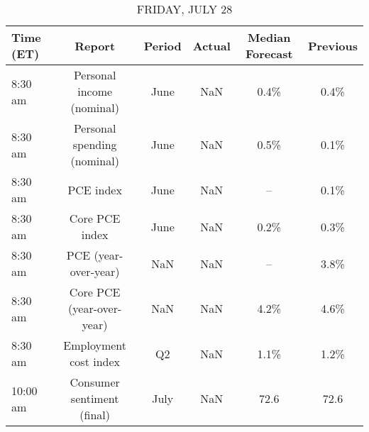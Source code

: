 \documentclass{article}%
\begin{document}
\begin{table}[htbp]%
\caption{FRIDAY, JULY 28}%
\centering%
\begin{adjustbox}{width=1\textwidth}%
\begin{tabular}{lccccc}
\toprule
Time (ET) &                      Report & Period & Actual & Median Forecast & Previous \\
\midrule
  8:30 am &   Personal income (nominal) &   June &    NaN &            0.4\% &     0.4\% \\
  8:30 am & Personal spending (nominal) &   June &    NaN &            0.5\% &     0.1\% \\
  8:30 am &                   PCE index &   June &    NaN &              -- &     0.1\% \\
  8:30 am &              Core PCE index &   June &    NaN &            0.2\% &     0.3\% \\
  8:30 am &        PCE (year-over-year) &    NaN &    NaN &              -- &     3.8\% \\
  8:30 am &   Core PCE (year-over-year) &    NaN &    NaN &            4.2\% &     4.6\% \\
  8:30 am &       Employment cost index &     Q2 &    NaN &            1.1\% &     1.2\% \\
 10:00 am &  Consumer sentiment (final) &   July &    NaN &            72.6 &     72.6 \\
\bottomrule
\end{tabular}
%
\end{adjustbox}%
\end{table}
\end{document}
